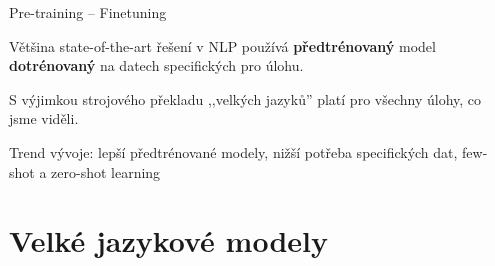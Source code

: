 \documentclass[aspectratio=169,dvipsnames]{beamer}
\begin{document}
\begin{frame}{Pre-training -- Finetuning}

    \centering

    {\huge
		Většina state-of-the-art řešení v NLP používá \textbf{předtrénovaný} model
		\textbf{dotrénovaný} na datech specifických pro úlohu.}

    \vspace{30pt}

    S výjimkou strojového překladu ,,velkých jazyků'' platí pro všechny úlohy,
    co jsme viděli.

    \vspace{10pt}

	Trend vývoje: lepší předtrénované modely, nižší potřeba specifických dat,
		few-shot a zero-shot learning

\end{frame}

\section{Velké jazykové modely}
\end{document}
